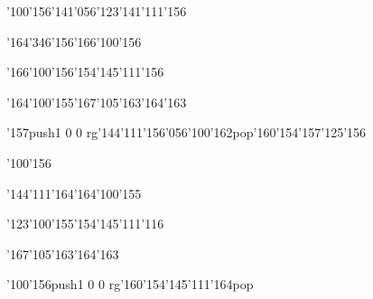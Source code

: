 \null\vfill\ipa\centerline{\enskip\enskip\enskip\enskip\char'100\char'156\enskip\char'141\char'056\char'123\char'141\char'111\char'156}\medskip\centerline{\enskip\enskip\enskip\enskip\enskip\char'164\char'346\char'156\enskip\enskip\enskip\enskip\enskip\enskip\enskip\enskip\char'166\char'100\char'156}\medskip\centerline{\enskip\enskip\enskip\char'166\char'100\char'156\enskip\enskip\enskip\enskip\enskip\char'154\char'145\char'111\char'156\enskip\enskip\enskip\enskip}\medskip\centerline{\enskip\char'164\char'100\char'155\enskip\enskip\enskip\enskip\enskip\enskip\char'167\char'105\char'163\char'164\char'163}\medskip\centerline{\enskip\char'157\enskip\pdfcolorstack\match push{1 0 0 rg}\char'144\char'111\char'156\char'056\char'100\char'162\pdfcolorstack\match pop{}\enskip\char'160\char'154\char'157\char'125\char'156}\medskip\vfill\footline{\hfil\tt\folio\hfil}\eject
\null\vfill\ipa\centerline{\enskip\enskip\enskip\enskip\char'100\char'156\enskip\enskip\enskip\enskip\enskip\enskip}\medskip\centerline{\enskip\enskip\enskip\enskip\enskip\char'144\char'111\char'164\enskip\enskip\enskip\char'164\char'100\char'155\enskip\enskip\enskip\enskip\enskip\enskip}\medskip\centerline{\enskip\enskip\enskip\char'123\char'100\char'155\enskip\enskip\enskip\enskip\enskip\char'154\char'145\char'111\char'116\enskip\enskip\enskip\enskip}\medskip\centerline{\enskip\enskip\enskip\enskip\enskip\enskip\enskip\enskip\enskip\char'167\char'105\char'163\char'164\char'163}\medskip\centerline{\enskip\enskip\enskip\enskip\enskip\enskip\char'100\char'156\enskip\pdfcolorstack\match push{1 0 0 rg}\char'160\char'154\char'145\char'111\char'164\pdfcolorstack\match pop{}}\medskip\vfill\footline{\hfil\tt\folio\hfil}\eject\bye